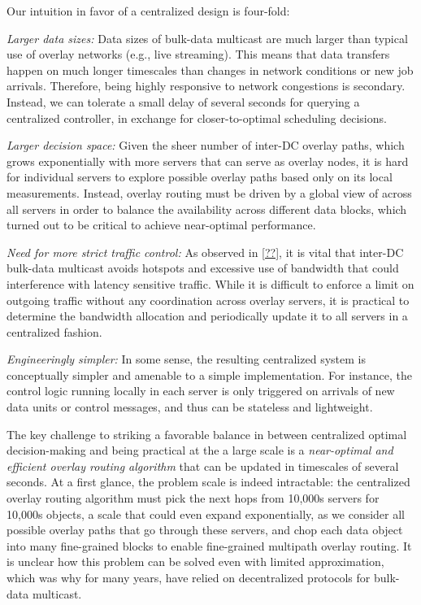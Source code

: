 Our intuition in favor of a centralized design is four-fold:
\begin{packedenumerate}
\item {\em Larger data sizes:} 
Data sizes of bulk-data multicast are much larger 
than typical use of overlay networks (e.g., live streaming).
This means that data transfers happen on much longer timescales 
than changes in network conditions or new job arrivals. 
Therefore, being highly responsive to network congestions 
is secondary.
Instead, we can tolerate a small delay of several seconds for
querying a centralized controller,
in exchange for closer-to-optimal scheduling decisions.
\item {\em Larger decision space:} 
Given the sheer number of inter-DC overlay paths, 
which grows exponentially with more servers that can
serve as overlay nodes, 
it is hard for individual servers to explore possible overlay 
paths based only on its local measurements.
Instead, overlay routing must be driven by a global 
view of across all servers in order to 
balance the availability across different data blocks, which 
turned out to be critical to achieve near-optimal performance.
\item {\em Need for more strict traffic control:}
As observed in \Section\ref{??}, it is vital that inter-DC 
bulk-data multicast avoids hotspots and excessive use of 
bandwidth that could interference with latency sensitive traffic.
While it is difficult to enforce a limit on outgoing traffic
without any coordination across overlay servers, it is practical
to determine the bandwidth allocation and periodically update it
to all servers in a centralized fashion.
\item {\em Engineeringly simpler:} 
In some sense, the resulting centralized system is conceptually
simpler and amenable to a simple implementation.
For instance, the control logic running locally in each server
is only triggered on arrivals of new data units or control messages,
and thus can be stateless and lightweight.

\end{packedenumerate}

The key challenge to striking a favorable balance in \name between
centralized optimal decision-making and being practical at the
a large scale is a {\em near-optimal and efficient overlay routing
algorithm} that can be updated in timescales of several seconds.
At a first glance, the problem scale is indeed intractable:
the centralized overlay routing algorithm must pick the next hops
from 10,000s servers for 10,000s objects, a scale that could
even expand exponentially, as we consider all possible
overlay paths that go through these servers, and chop each data
object into many fine-grained blocks to enable fine-grained
multipath overlay routing.
It is unclear how this problem can be solved even with
limited approximation, which was why for many years, \company have
relied on decentralized protocols for bulk-data multicast.

